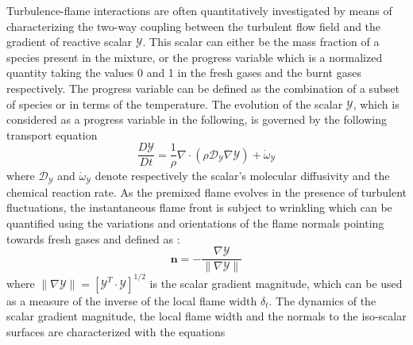 Turbulence-flame interactions are often quantitatively investigated by means of characterizing
the two-way coupling between the turbulent flow field and the gradient of reactive scalar $\mathcal{Y}$.
%
This scalar can either be the mass fraction of a species present in the mixture, or the progress
variable which is a normalized quantity taking the values 0 and 1 in the fresh gases and the
burnt gases respectively.
%
The progress variable can be defined as the combination of a subset of species or in terms of the
temperature.
%
The evolution of the scalar $\mathcal{Y}$, which is considered as a progress variable in the following, 
is governed by the following transport equation
%
\begin{equation}
\frac{D\mathcal{Y}}{Dt} = \frac{1}{\rho} \nabla \cdot \left(\rho \mathcal{D}_{\mathcal{Y}}
\nabla \mathcal{Y}\right) +\dot{\omega}_{\mathcal{Y}}
\label{eq:trans_scalar}
\end{equation}
%
where $\mathcal{D}_{\mathcal{Y}}$ and $\dot{\omega}_{\mathcal{Y}}$ denote respectively the scalar's 
molecular diffusivity and the chemical reaction rate.
%
As the premixed flame evolves in the presence of turbulent fluctuations, the instantaneous flame 
front is subject to wrinkling which can be quantified using the variations and orientations of 
the flame normals pointing towards fresh gases and defined as :
\begin{equation}
\mathbf{n} = -\frac{\nabla \mathcal{Y}}{ \|\nabla \mathcal{Y}\|}
\end{equation}
%
where $\|\nabla \mathcal{Y}\| = \left[\mathcal{Y}^T\cdot\mathcal{Y}\right]^{1/2}$ is the scalar 
gradient magnitude, which can be used as a measure of the inverse of the local flame width $\delta_t$.
%
The dynamics of the scalar gradient magnitude, the local flame width and the normals to the 
iso-scalar surfaces are characterized with the equations


